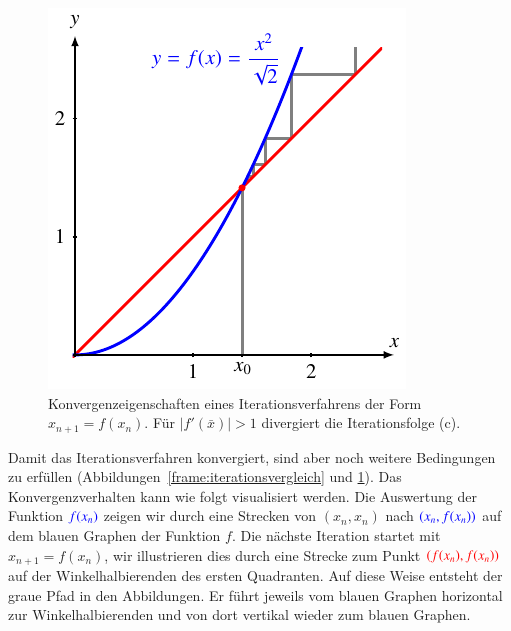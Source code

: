 \begin{figure}
\centering
\includegraphics{chapters/1a-frames/images/div.pdf}
\caption{Konvergenzeigenschaften eines Iterationsverfahrens der Form
$x_{n+1}=f(x_n)$.
Für $|f'(\bar{x})|>1$ divergiert die Iterationsfolge (c).
\label{frame:divergenz}}
\end{figure}

Damit das Iterationsverfahren konvergiert, sind aber noch weitere
Bedingungen zu erfüllen (Abbildungen~\ref{frame:iterationsvergleich}
und \ref{frame:divergenz}).
Das Konvergenzverhalten kann wie folgt visualisiert werden.
Die Auswertung der Funktion $\color{blue}f(x_n)$ zeigen wir durch
eine Strecken von $(x_n,x_n)$ nach $\color{blue}(x_n,f(x_n))$ auf
dem blauen Graphen der Funktion $f$.
Die nächste Iteration startet mit $x_{n+1} = f(x_n)$, wir illustrieren
dies durch eine Strecke zum Punkt $\color{red}(f(x_n),f(x_n))$ auf der
Winkelhalbierenden des ersten Quadranten.
Auf diese Weise entsteht der graue Pfad in den Abbildungen.
\label{frame:grauerpfad}
Er führt jeweils vom blauen Graphen horizontal zur Winkelhalbierenden
und von dort vertikal wieder zum blauen Graphen.


